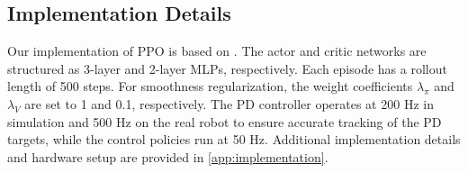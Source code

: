 \subsection{Implementation Details} Our implementation of PPO is based on \cite{Rudin2021LearningTW}. The actor and critic networks are structured as 3-layer and 2-layer MLPs, respectively. Each episode has a rollout length of 500 steps. For smoothness regularization, the weight coefficients $\lambda_\pi$ and $\lambda_V$ are set to 1 and 0.1, respectively. The PD controller operates at 200 Hz in simulation and 500 Hz on the real robot to ensure accurate tracking of the PD targets, while the control policies run at 50 Hz. Additional implementation details and hardware setup are provided in \cref{app:implementation}.
